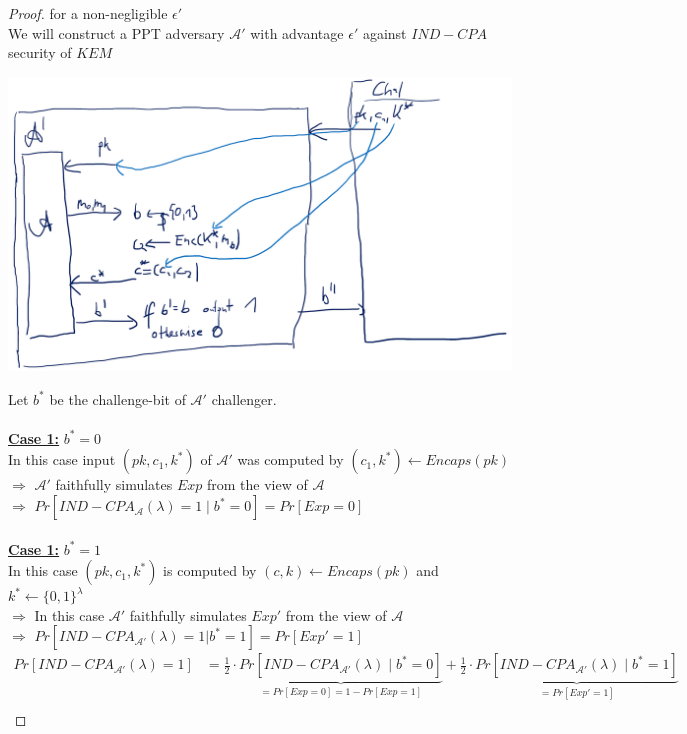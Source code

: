 \begin{proof}
    	for a non-negligible $\epsilon'$\\
    	We will construct a PPT adversary $\mathcal{A}'$ with advantage $\epsilon'$ against $IND-CPA$ security of $KEM$
    	\begin{center}
    		\includegraphics[width=160mm]{Graphics/Hybrid Encryption/he6.png}
    	\end{center}
    	Let $b^*$ be the challenge-bit of $\mathcal{A}'$ challenger.\\\\
    	\textbf{\underline{Case 1:}} $b^* = 0$\\
    	In this case input $(pk,c_1,k^*)$ of $\mathcal{A}'$ was computed by $(c_1,k^*) \leftarrow Encaps(pk)$\\
    	$\Rightarrow$ $\mathcal{A}'$ faithfully simulates $Exp$ from the view of $\mathcal{A}$\\
    	$\Rightarrow$ $Pr[IND-CPA_{\mathcal{A}}(\lambda)=1 \mid b^*=0] = Pr[Exp=0]$\\\\
    	\textbf{\underline{Case 1:}} $b^* = 1$\\
    	In this case $(pk,c_1,k^*)$ is computed by $(c,k) \leftarrow Encaps(pk)$ and $k^* \leftarrow \{0,1\}^{\lambda}$\\
    	$\Rightarrow$ In this case $\mathcal{A}'$ faithfully simulates $Exp'$ from the view of $\mathcal{A}$\\
    	$\Rightarrow$ $Pr[IND-CPA_{\mathcal{A}'}(\lambda)=1 | b^*=1] = Pr[Exp'=1]$
    	\begin{align*}
    	    Pr[IND-CPA_{\mathcal{A}'}(\lambda)=1] &= \frac{1}{2} \cdot \underbrace{Pr[IND-CPA_{\mathcal{A}'}(\lambda) \mid b^*=0]}_{=Pr[Exp=0]=1-Pr[Exp=1]} 
    	                                           + \frac{1}{2} \cdot \underbrace{Pr[IND-CPA_{\mathcal{A}'}(\lambda) \mid b^*=1]}_{=Pr[Exp'=1]}\\

\end{align*}
\end{proof}
